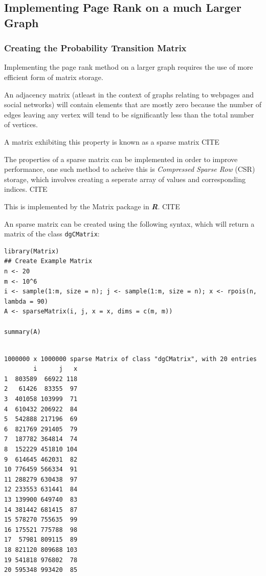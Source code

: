 \documentclass[11pt]{article}
\begin{document}
\subsection{Implementing Page Rank on a much Larger Graph}
\label{sec:orgbe342f1}
\subsubsection{Creating the Probability Transition Matrix}
\label{sec:org3f69032}
Implementing the page rank method on a larger graph requires the use of more efficient form of matrix storage.

An adjacency matrix (atleast in the context of graphs relating to webpages and social networks) will contain elements that are mostly zero because the number of edges leaving any vertex will tend to be significantly less than the total number of vertices.

A matrix exhibiting this property is known as a sparse matrix CITE

The properties of a sparse matrix can be implemented in order to improve performance, one such method to acheive this is \emph{Compressed Sparse Row} (CSR) storage, which involves creating a seperate array of values and corresponding indices. CITE

This is implemented by the Matrix package in \textbf{\emph{R}}. CITE

An sparse matrix can be created using the following syntax, which will return a matrix of the class \texttt{dgCMatrix}:

\lstset{language=r,label= ,caption= ,captionpos=b,numbers=none}
\begin{lstlisting}
library(Matrix)
## Create Example Matrix
n <- 20
m <- 10^6
i <- sample(1:m, size = n); j <- sample(1:m, size = n); x <- rpois(n, lambda = 90)
A <- sparseMatrix(i, j, x = x, dims = c(m, m))

summary(A)
\end{lstlisting}

\begin{verbatim}

1000000 x 1000000 sparse Matrix of class "dgCMatrix", with 20 entries
        i      j   x
1  803589  66922 118
2   61426  83355  97
3  401058 103999  71
4  610432 206922  84
5  542888 217196  69
6  821769 291405  79
7  187782 364814  74
8  152229 451810 104
9  614645 462031  82
10 776459 566334  91
11 288279 630438  97
12 233553 631441  84
13 139900 649740  83
14 381442 681415  87
15 578270 755635  99
16 175521 775788  98
17  57981 809115  89
18 821120 809688 103
19 541818 976802  78
20 595348 993420  85
\end{verbatim}
\end{document}
